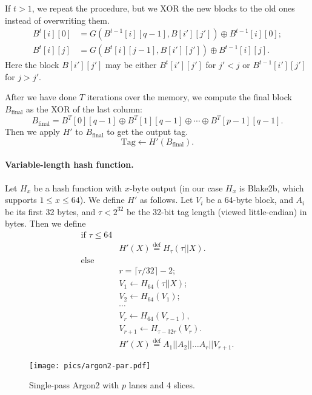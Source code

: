 \documentclass[a4paper]{article}
\begin{document}
If $t>1$, we repeat the procedure, but we XOR the new blocks to the old ones instead of overwriting them. 
\begin{align*}
B^t[i][0] &=G(B^{t-1}[i][q-1], B[i'][j']) \oplus B^{t-1}[i][0];\\
B^t[i][j] &= G(B^{t}[i][j-1], B[i'][j'])\oplus B^{t-1}[i][j].
\end{align*}
Here the block $B[i'][j']$ may be either $B^t[i'][j']$ for $j'<j$ or $B^{t-1}[i'][j']$ for $j>j'$.

After we have done  $T$ iterations over the memory, we compute the final block $B_{\mathrm{final}}$ as the XOR of the last column:
$$
B_{\mathrm{final}} = B^T[0][q-1] \oplus B^T[1][q-1]\oplus \cdots\oplus B^T[p-1][q-1].
$$
Then we apply $H'$ to $B_{\mathrm{final}}$ to get the output tag.
$$
\text{Tag} \leftarrow H'(B_{\mathrm{final}}).
$$


\paragraph{Variable-length hash function.} Let $H_x$ be a hash function with $x$-byte output (in our case $H_x$ is Blake2b, which supports $1\leq x \leq 64$). We define $H'$ as follows. Let $V_i$ be a 64-byte block, and  $A_i$ be its first 32 bytes,
and $\tau<2^{32}$ be the 32-bit tag length (viewed little-endian) in bytes. 
Then we define
$$
\begin{array}{rl}
\text{if }\tau \leq 64&\\& H'(X) \overset{\text{def}}{=} H_{\tau}(\tau ||X).\\
\text{else}&\\
& r = \lceil\tau/32\rceil-2;\\
&V_1\leftarrow H_{64}(\tau||X);\\
&V_2 \leftarrow H_{64}(V_1);\\
&\cdots\\
&V_r  \leftarrow H_{64}(V_{r-1}),\\
&V_{r+1} \leftarrow H_{\tau - 32r}(V_{r}).\\
&H'(X) \overset{\text{def}}{=} A_1||A_2||\ldots A_r||V_{r+1}.
\end{array}
$$

 \begin{figure}[ht]
  \ifpdf
\begin{center}
  \texttt{[image: pics/argon2-par.pdf]}
  \caption{Single-pass \textsf{Argon2} with $p$ lanes and 4 slices. }\label{fig:argon2}
\end{center}
\fi
  \end{figure}
\end{document}
